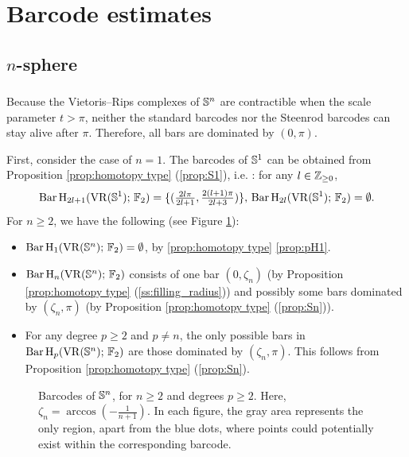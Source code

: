 
\section{Barcode estimates}\label{s:computations}

\subsection{$n$-sphere}\label{ss:Sn}

\subsubsection{}

Because the Vietoris--Rips complexes of $\mathbb{S}^n$ are contractible when the scale parameter $t>\pi$, neither the standard barcodes nor the Steenrod barcodes can stay alive after $\pi$.
Therefore, all bars are dominated by $(0,\pi)$.

First, consider the case of $n=1$.
The barcodes of $\mathbb{S}^1$ can be obtained from Proposition \ref{prop:homotopy type} (\ref{prop:S1}), i.e. \cite[Theorem~7.4]{adamaszek2017vietoris}: for any $l \in \mathbb{Z}_{\geq 0}$,
\begin{equation}\label{eq:barc of S1}
	\operatorname{Bar} \operatorname{H}_{2l+1}(\operatorname{VR}(\mathbb{S}^1);\,{\mathbb{F}_2})=\{(\tfrac{2l\pi}{2l+1},\tfrac{2(l+1)\pi}{2l+3})\},\, \operatorname{Bar} \operatorname{H}_{2l}(\operatorname{VR}(\mathbb{S}^1);\,{\mathbb{F}_2})=\emptyset.
\end{equation}
For $n\geq 2$, we have the following (see Figure \ref{fig:Sk}):
\begin{itemize}
	\item $\operatorname{Bar} \operatorname{H}_{1}(\operatorname{VR}(\mathbb{S}^n);\,{\mathbb{F}_2}) = \emptyset$, by \cref{prop:homotopy type} \cref{prop:pH1}.
	\item $\operatorname{Bar} \operatorname{H}_{n}(\operatorname{VR}(\mathbb{S}^n);\,{\mathbb{F}_2})$ consists of one bar $(0,\zeta_n)$ (by Proposition \ref{prop:homotopy type} (\ref{ss:filling_radius})) and possibly some bars dominated by $(\zeta_n,\pi)$ (by Proposition \ref{prop:homotopy type} (\ref{prop:Sn})).
	\item For any degree $p\geq 2$ and $p\neq n$, the only possible bars in $\operatorname{Bar} \operatorname{H}_{p}(\operatorname{VR}(\mathbb{S}^n);\,{\mathbb{F}_2})$ are those dominated by $(\zeta_n,\pi)$.
	This follows from Proposition \ref{prop:homotopy type} (\ref{prop:Sn}).
\end{itemize}

\begin{figure}[ht]
	\centering
	
	\caption{Barcodes of $\mathbb{S}^n$, for $n\geq 2$ and degrees $p\geq 2$.
		Here, $\zeta_n=\arccos(-\tfrac{1}{n+1})$.
		In each figure, the gray area represents the only region, apart from the blue dots, where points could potentially exist within the corresponding barcode.}
	\label{fig:Sk}
\end{figure}

